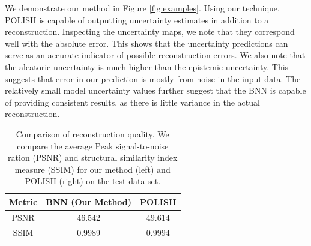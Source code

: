 \documentclass{article}
\begin{document}
We demonstrate our method in Figure \ref{fig:examples}. Using our technique, POLISH is capable of outputting uncertainty estimates in addition to a reconstruction. Inspecting the uncertainty maps, we note that they correspond well with the absolute error. This shows that the uncertainty predictions can serve as an accurate indicator of possible reconstruction errors. We also note that the aleatoric uncertainty is much higher than the epistemic uncertainty. This suggests that error in our prediction is mostly from noise in the input data. The relatively small model uncertainty values further suggest that the BNN is capable of providing consistent results, as there is little variance in the actual reconstruction.

\begin{table}[]
    \centering
    \begin{tabular}{ccc}
        Metric & BNN (Our Method) & POLISH \\
         \hline
        PSNR & 46.542 & 49.614 \\
        SSIM & 0.9989 & 0.9994 \\
    \end{tabular}
    \caption{Comparison of reconstruction quality. We compare the average Peak signal-to-noise ration (PSNR) and structural similarity index measure (SSIM) for our method (left) and POLISH (right) on the test data set.}
    \label{tab:metrics}
\end{table}
\end{document}
